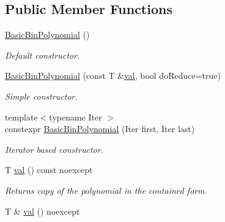 \subsection*{Public Member Functions}
\begin{DoxyCompactItemize}
\item 
\mbox{\label{class_g_flinalg_1_1_basic_bin_polynomial_a7eb2fdf38bab3acfd55ac9d5548452d4}} 
\mbox{\hyperlink{class_g_flinalg_1_1_basic_bin_polynomial_a7eb2fdf38bab3acfd55ac9d5548452d4}{Basic\+Bin\+Polynomial}} ()
\begin{DoxyCompactList}\small\item\em Default constructor. \end{DoxyCompactList}\item 
\mbox{\hyperlink{class_g_flinalg_1_1_basic_bin_polynomial_abe29be6adbd2e8cac7d0700008f25f3f}{Basic\+Bin\+Polynomial}} (const T \&\mbox{\hyperlink{class_g_flinalg_1_1_basic_bin_polynomial_a6389212b0031b6d0a8e45cdb1392dbd7}{val}}, bool do\+Reduce=true)
\begin{DoxyCompactList}\small\item\em Simple constructor. \end{DoxyCompactList}\item 
{\footnotesize template$<$typename Iter $>$ }\\constexpr \mbox{\hyperlink{class_g_flinalg_1_1_basic_bin_polynomial_a24dfc872ab484815b9d38558d13ac074}{Basic\+Bin\+Polynomial}} (Iter first, Iter last)
\begin{DoxyCompactList}\small\item\em Iterator based constructor. \end{DoxyCompactList}\item 
\mbox{\label{class_g_flinalg_1_1_basic_bin_polynomial_a6389212b0031b6d0a8e45cdb1392dbd7}} 
T \mbox{\hyperlink{class_g_flinalg_1_1_basic_bin_polynomial_a6389212b0031b6d0a8e45cdb1392dbd7}{val}} () const noexcept
\begin{DoxyCompactList}\small\item\em Returns copy of the polynomial in the contained form. \end{DoxyCompactList}\item 
T \& \mbox{\hyperlink{class_g_flinalg_1_1_basic_bin_polynomial_a86d07870227edb5553b981f3183d0f9e}{val}} () noexcept
\item 
\mbox{\label{class_g_flinalg_1_1_basic_bin_polynomial_ace68fc139713e8efa3d9c60d5238caf4}} 

\end{DoxyCompactItemize}
